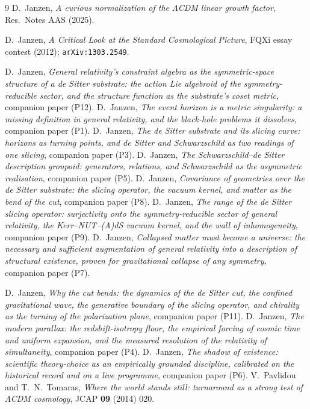 \documentclass[11pt,a4paper]{article}
\theoremstyle{plain}
\theoremstyle{definition}
\theoremstyle{remark}
\begin{document}
\begin{thebibliography}{9}
 D.~Janzen, \emph{A curious normalization of the $\Lambda$CDM linear growth factor}, Res.\ Notes AAS (2025).

 D.~Janzen, \emph{A Critical Look at the Standard Cosmological Picture}, FQXi essay contest (2012); \texttt{arXiv:1303.2549}.

 D.~Janzen,
\emph{General relativity's constraint algebra as the symmetric-space structure of a de Sitter substrate: the action Lie algebroid of the symmetry-reducible sector, and the structure function as the substrate's coset metric}, companion paper (P12).
 D.~Janzen, \emph{The event horizon is a metric singularity: a missing definition in general relativity, and the black-hole problems it dissolves}, companion paper (P1).
 D.~Janzen, \emph{The de Sitter substrate and its slicing curve: horizons as turning points, and de Sitter and Schwarzschild as two readings of one slicing}, companion paper (P3).
 D.~Janzen, \emph{The Schwarzschild--de Sitter description groupoid: generators, relations, and Schwarzschild as the asymmetric realisation}, companion paper (P5).
 D.~Janzen, \emph{Covariance of geometries over the de Sitter substrate: the slicing operator, the vacuum kernel, and matter as the bend of the cut}, companion paper (P8).
 D.~Janzen, \emph{The range of the de Sitter slicing operator: surjectivity onto the symmetry-reducible sector of general relativity, the Kerr--NUT--(A)dS vacuum kernel, and the wall of inhomogeneity}, companion paper (P9).
 D.~Janzen, \emph{Collapsed matter must become a universe: the necessary and sufficient augmentation of general relativity into a description of structural existence, proven for gravitational collapse of any symmetry}, companion paper (P7).

 D.~Janzen, \emph{Why the cut bends: the dynamics of the de Sitter cut, the confined gravitational wave, the generative boundary of the slicing operator, and chirality as the turning of the polarization plane}, companion paper (P11).
 D.~Janzen, \emph{The modern parallax: the redshift-isotropy floor, the empirical forcing of cosmic time and uniform expansion, and the measured resolution of the relativity of simultaneity}, companion paper (P4).
 D.~Janzen, \emph{The shadow of existence: scientific theory-choice as an empirically grounded discipline, calibrated on the historical record and on a live programme}, companion paper (P6).
 V.~Pavlidou and T.~N.~Tomaras, \emph{Where the world stands still: turnaround as a strong test of $\Lambda$CDM cosmology}, JCAP \textbf{09} (2014) 020.


\end{thebibliography}
\end{document}
